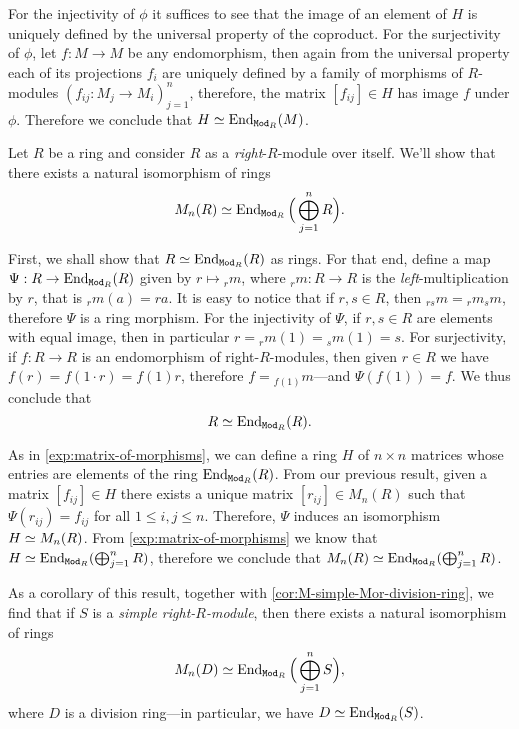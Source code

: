 \begin{example}
    For the injectivity of \(\phi\) it suffices to see that the image of an element
    of \(H\) is uniquely defined by the universal property of the coproduct. For the
    surjectivity of \(\phi\), let \(f: M \to M\) be any endomorphism, then again
    from the universal property each of its projections \(f_i\) are uniquely defined
    by a family of morphisms of \(R\)-modules \((f_{i j}: M_j \to M_i)_{j=1}^n\),
    therefore, the matrix \([f_{i j}] \in H\) has image \(f\) under
    \(\phi\). Therefore we conclude that \(H \simeq \operatorname{End}_{{\texttt{Mod}_{R}}}(M)\).
\end{example}

\begin{example}
    \label{exp:matrix-of-morphisms-over-ring}
    Let \(R\) be a ring and consider \(R\) as a \emph{right}-\(R\)-module over
    itself. We'll show that there exists a natural isomorphism of rings
    \[
        M_n(R) \simeq \operatorname{End}_{{\texttt{Mod}_{R}}}\Big( \bigoplus_{j=1}^n R \Big).
    \]

    First, we shall show that \(R \simeq \operatorname{End}_{{\texttt{Mod}_{R}}}(R)\) as rings. For that end,
    define a map \(\Psi: R \to \operatorname{End}_{{\texttt{Mod}_{R}}}(R)\) given by \(r \mapsto {}_rm\),
    where \({}_rm: R \to R\) is the \emph{left}-multiplication by \(r\), that is
    \({}_rm(a) = r a\). It is easy to notice that if \(r, s \in R\), then
    \({}_{r s}m = {}_rm {}_sm\), therefore \(\Psi\) is a ring morphism. For the
    injectivity of \(\Psi\), if \(r, s \in R\) are elements with equal image, then
    in particular \(r = {}_rm(1) = {}_sm(1) = s\). For surjectivity, if
    \(f: R \to R\) is an endomorphism of right-\(R\)-modules, then given \(r \in R\)
    we have \(f(r) = f(1 \cdot r) = f(1) r\), therefore \(f = {}_{f(1)}m\)---and
    \(\Psi(f(1)) = f\). We thus conclude that
    \[
        R \simeq \operatorname{End}_{{\texttt{Mod}_{R}}}(R).
    \]

    As in \cref{exp:matrix-of-morphisms}, we can define a ring \(H\) of
    \(n \times n\) matrices whose entries are elements of the ring
    \(\operatorname{End}_{{\texttt{Mod}_{R}}}(R)\). From our previous result, given a matrix
    \([f_{ij}] \in H\) there exists a unique matrix \([r_{ij}] \in M_n(R)\) such
    that \(\Psi(r_{ij}) = f_{ij}\) for all \(1 \leq i, j \leq n\). Therefore,
    \(\Psi\) induces an isomorphism \(H \simeq M_n(R)\). From
    \cref{exp:matrix-of-morphisms} we know that
    \(H \simeq \operatorname{End}_{{\texttt{Mod}_{R}}}(\bigoplus_{j=1}^n R)\), therefore we conclude that
    \(M_n(R) \simeq \operatorname{End}_{{\texttt{Mod}_{R}}}(\bigoplus_{j=1}^n R)\).

    As a corollary of this result, together with
    \cref{cor:M-simple-Mor-division-ring}, we find that if \(S\) is a \emph{simple
        right-\(R\)-module}, then there exists a natural isomorphism of rings
    \[
        M_n(D) \simeq \operatorname{End}_{{\texttt{Mod}_{R}}}\Big(\bigoplus_{j=1}^n S \Big),
    \]
    where \(D\) is a division ring---in particular, we have
    \(D \simeq \operatorname{End}_{{\texttt{Mod}_{R}}}(S)\).
\end{example}


